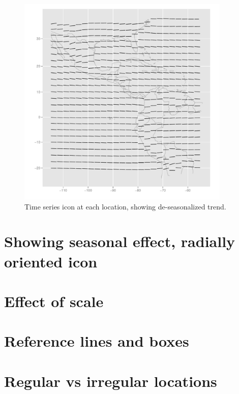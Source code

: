 \documentclass{article}
\begin{document}
\begin{figure}[htp]
\centerline{\includegraphics[width=4in]{images/nasa-deseas-trend.pdf}}
\caption{Time series icon at each location, showing de-seasonalized trend.}
\end{figure}

\section{Showing seasonal effect, radially oriented icon}

\section{Effect of scale}

\section{Reference lines and boxes}

\section{Regular vs irregular locations}
\end{document}
